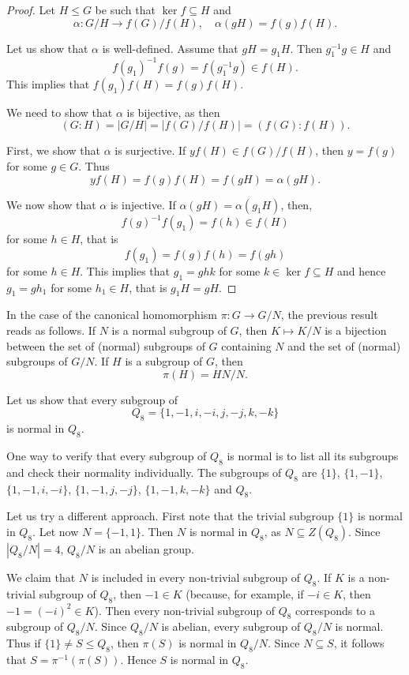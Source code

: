 \begin{proof}
Let $H\leq G$ be such that
$\ker f\subseteq H$ and 
\[
\alpha\colon G/H\to f(G)/f(H),\quad \alpha(gH)=f(g)f(H).
\]

Let us show that $\alpha$ is well-defined. Assume that 
$gH=g_1H$. Then $g_1^{-1}g\in H$ and 
\[
  f(g_1)^{-1}f(g)=f(g_1^{-1}g)\in f(H).
\]
This implies that $f(g_1)f(H)=f(g)f(H)$. 

We need to show that $\alpha$ is bijective, as then 
\[
(G:H)=|G/H|=|f(G)/f(H)|=(f(G):f(H)).
\]

First, we show that $\alpha$ is surjective. If $yf(H)\in f(G)/f(H)$, 
then
$y=f(g)$ for some $g\in G$. Thus
\[
yf(H)=f(g)f(H)=f(gH)=\alpha(gH).
\]

We now show that $\alpha$ is injective. If $\alpha(gH)=\alpha(g_1H)$, then, 
\[
f(g)^{-1}f(g_1)=f(h)\in f(H)
\]
for some $h\in H$, that is 
\[
f(g_1)=f(g)f(h)=f(gh)
\]
for some $h\in H$. 
This implies that $g_1=ghk$ for some $k\in\ker f\subseteq H$ and hence 
$g_1=gh_1$ for some $h_1\in H$, that is $g_1H=gH$.
\end{proof}

In the case of the canonical homomorphism $\pi\colon
 G\to G/N$, the previous result reads as follows. 
If $N$ is a normal subgroup of $G$, then
$K\mapsto K/N$ is a bijection between the set of 
(normal) subgroups of $G$ containing $N$ and the 
set of (normal) subgroups of $G/N$.
If $H$ is a subgroup of $G$, then
\[
\pi(H)=HN/N.
\]
\begin{example}
\label{exa:Q8normal}
Let us show that every subgroup of 
\[
Q_8=\{1,-1,i,-i,j,-j,k,-k\}
\]
is normal in $Q_8$.

One way to verify that every subgroup of $Q_8$ is normal is to list all its subgroups 
and check their normality individually. The subgroups of $Q_8$ are $\{1\}$, $\{1,-1\}$, $\{1,-1,i,-i\}$, $\{1,-1,j,-j\}$, $\{1,-1,k,-k\}$ and $Q_8$. 

Let us try a different approach. First note that
the trivial subgroup $\{1\}$ is normal in $Q_8$. Let now $N=\{-1,1\}$. 
Then $N$ is normal in $Q_8$, as $N\subseteq Z(Q_8)$. Since $|Q_8/N|=4$, 
$Q_8/N$ is an abelian group. 

We claim that $N$ is included in every non-trivial 
subgroup of $Q_8$. If 
$K$ is a non-trivial subgroup of $Q_8$, then $-1\in K$ (because, for example, if $-i\in K$, then
 $-1=(-i)^2\in K$).
Then every non-trivial subgroup of $Q_8$ corresponds to a subgroup of $Q_8/N$. 
Since $Q_8/N$ is abelian, every subgroup of $Q_8/N$ is normal. Thus 
if $\{1\}\ne S\leq Q_8$, then 
$\pi(S)$ is normal in $Q_8/N$.
Since $N\subseteq S$, it follows that
$S=\pi^{-1}(\pi(S))$. Hence $S$ is normal in $Q_8$. 
\end{example}

